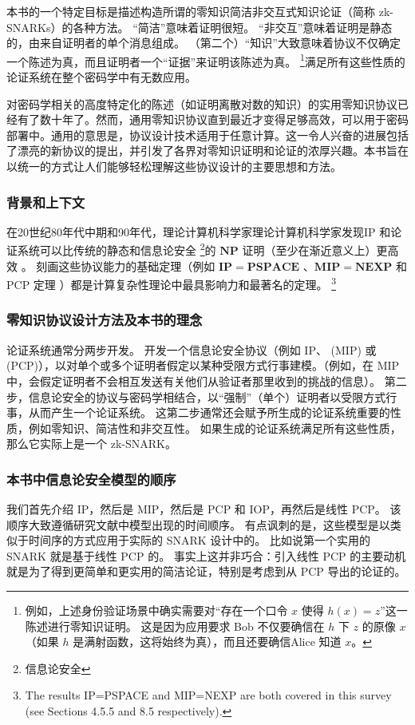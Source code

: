 本书的一个特定目标是描述构造所谓的零知识简洁非交互式知识论证（简称 zk-SNARKs）的各种方法。 “简洁”意味着证明很短。 “非交互”意味着证明是静态的，由来自证明者的单个消息组成。 （第二个）“知识”大致意味着协议不仅确定一个陈述为真，而且证明者一个“证据”来证明该陈述为真。 \footnote{例如，上述身份验证场景中确实需要对“存在一个口令 $x$ 使得 $h(x)=z$”这一陈述进行零知识证明。 这是因为应用要求 Bob 不仅要确信在 $h$ 下 $z$ 的原像 $x$（如果 $h$ 是满射函数，这将始终为真），而且还要确信Alice 知道 $x$。}满足所有这些性质的论证系统在整个密码学中有无数应用。

对密码学相关的高度特定化的陈述（如证明离散对数的知识\cite{Sch89}）的实用零知识协议已经有了数十年了。然而，通用零知识协议直到最近才变得足够高效，可以用于密码部署中。通用的意思是，协议设计技术适用于任意计算。这一令人兴奋的进展包括了漂亮的新协议的提出，并引发了各界对零知识证明和论证的浓厚兴趣。本书旨在以统一的方式让人们能够轻松理解这些协议设计的主要思想和方法。

\subsubsection{背景和上下文} 在20世纪80年代中期和90年代，理论计算机科学家理论计算机科学家发现IP 和论证系统可以比传统的静态和信息论安全 \footnote{信息论安全}的 $\mathbf{NP}$ 证明（至少在渐近意义上）更高效 。
刻画这些协议能力的基础定理（例如 $\mathbf{IP=PSPACE}$ \cite{LFKN92,Sha92}、$\mathbf{MIP=NEXP}$ \cite{BFL91} 和 PCP 定理 \cite{ALM+98,AS98}）都是计算复杂性理论中最具影响力和最著名的定理。 \footnote{The results IP=PSPACE and MIP=NEXP are both covered in this survey (see Sections 4.5.5 and 8.5 respectively).}




\subsubsection{零知识协议设计方法及本书的理念}  
论证系统通常分两步开发。 
开发一个信息论安全协议（例如 IP、 (MIP) 或 (PCP)），以对单个或多个证明者假定以某种受限方式行事建模。（例如，在 MIP 中，会假定证明者不会相互发送有关他们从验证者那里收到的挑战的信息）。 
第二步，信息论安全的协议与密码学相结合，以“强制”（单个）证明者以受限方式行事，从而产生一个论证系统。 这第二步通常还会赋予所生成的论证系统重要的性质，例如零知识、简洁性和非交互性。 如果生成的论证系统满足所有这些性质，那么它实际上是一个 zk-SNARK。

\subsubsection{本书中信息论安全模型的顺序} 
我们首先介绍 IP，然后是 MIP，然后是 PCP 和 IOP，再然后是线性 PCP。 该顺序大致遵循研究文献中模型出现的时间顺序。 有点讽刺的是，这些模型是以类似于时间序的方式应用于实际的 SNARK 设计中的。 比如说第一个实用的 SNARK 就是基于线性 PCP 的。 事实上这并非巧合：引入线性 PCP 的主要动机就是为了得到更简单和更实用的简洁论证，特别是考虑到从 PCP 导出的论证的。


